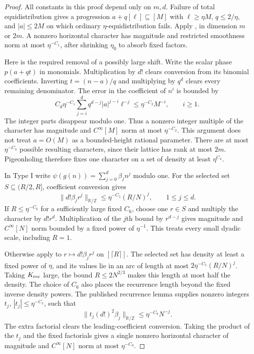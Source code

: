 \documentclass[11pt]{article}
\theoremstyle{definition}
\theoremstyle{remark}
\begin{document}
\begin{proof}
All constants in this proof depend only on $m,d$.  Failure of total
equidistribution gives a progression $a+q[\ell]\subseteq[M]$ with
$\ell\geq\eta M$, $q\leq2/\eta$, and $|a|\leq2M$ on which ordinary
$\eta$-equidistribution fails.  Apply
\cite[Theorem~2.9]{GTOrbits2012}, in dimension $m$ or $2m$.  A nonzero
horizontal character has magnitude and restricted smoothness norm at
most $\eta^{-C_1}$, after shrinking $\eta_0$ to absorb fixed factors.

Here is the required removal of a possibly large shift.  Write the scalar
phase $p(a+qt)$ in monomials.  Multiplication by $d!$ clears conversion
from its binomial coefficients.  Inverting $t=(n-a)/q$ and multiplying
by $q^d$ clears every remaining denominator.  The error in the coefficient
of $n^i$ is bounded by
\begin{equation}\label{gi-shift-removal}
 C_d\eta^{-C_1}\sum_{j=i}^d q^{d-j}|a|^{j-i}\ell^{-j}
       \leq\eta^{-C_2}M^{-i},\qquad i\geq1.
\end{equation}
The integer parts disappear modulo one.  Thus a nonzero integer multiple
of the character has magnitude and $C^\infty[M]$ norm at most
$\eta^{-C_2}$.  This argument does not treat $a=O(M)$ as a bounded-height
rational parameter.  There are at most $\eta^{-C_3}$ possible resulting
characters, since their lattice has rank at most $2m$.  Pigeonholing
therefore fixes one character on a set of density at least $\eta^{C_4}$.

In Type I write
$\psi(g(n))=\sum_{j=0}^d\beta_jn^j$ modulo one.  For the selected set
$S\subseteq(R/2,R]$, coefficient conversion gives
\begin{equation}\label{gi-one-coefficients}
 \|d!\beta_jr^j\|_{\mathbb R/\mathbb Z}
       \leq\eta^{-C_5}(R/N)^j,\qquad 1\leq j\leq d.
\end{equation}
If $R\leq\eta^{-C_6}$ for a sufficiently large fixed $C_6$, choose one
$r\in S$ and multiply the character by $d!r^d$.  Multiplication of the
$j$th bound by $r^{d-j}$ gives magnitude and $C^\infty[N]$ norm bounded
by a fixed power of $\eta^{-1}$.  This treats every small dyadic scale,
including $R=1$.

Otherwise apply \cite[Lemma~4.5]{GTOrbits2012} to
$r\mapsto d!\beta_jr^j$ on $[\lceil R\rceil]$.  The selected set has
density at least a fixed power of $\eta$, and its values lie in an arc
of length at most $2\eta^{-C_5}(R/N)^j$.  Taking $K_{\rm rec}$ large,
the bound $R\leq2N^{2/3}$ makes this length at most half the density.
The choice of $C_6$ also places the recurrence length beyond the fixed
inverse density powers.  The published recurrence lemma supplies
nonzero integers $t_j$, $|t_j|\leq\eta^{-C_7}$, such that
\begin{equation}\label{gi-recurrent-coefficients}
 \|t_j(d!)^2\beta_j\|_{\mathbb R/\mathbb Z}
                    \leq\eta^{-C_8}N^{-j}.
\end{equation}
The extra factorial clears the leading-coefficient conversion.  Taking
the product of the $t_j$ and the fixed factorials gives a single nonzero
horizontal character of magnitude and $C^\infty[N]$ norm at most
$\eta^{-C_9}$.


\end{proof}
\end{document}
